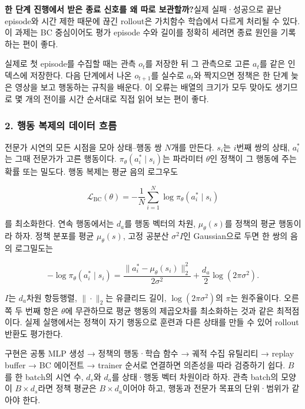 \documentclass[11pt,a4paper]{article}
\begin{document}
\par\medskip\noindent\textbf{한 단계 진행에서 받은 종료 신호를 왜 따로 보관할까?}\quad 실제 실패·성공으로 끝난 episode와 시간 제한 때문에 끊긴 rollout은 가치함수 학습에서 다르게 처리될 수 있다. 이 과제는 BC 중심이어도 평가 episode 수와 길이를 정확히 세려면 종료 원인을 기록하는 편이 좋다.\par

실제로 첫 episode를 수집할 때는 관측 $o_t$를 저장한 뒤 그 관측으로 고른 $a_t$를 같은 인덱스에 저장한다. 다음 단계에서 나온 $o_{t+1}$를 실수로 $a_t$와 짝지으면 정책은 한 단계 늦은 영상을 보고 행동하는 규칙을 배운다. 이 오류는 배열의 크기가 모두 맞아도 생기므로 몇 개의 전이를 시간 순서대로 직접 읽어 보는 편이 좋다.\par

\subsubsection{2. 행동 복제의 데이터 흐름}

전문가 시연의 모든 시점을 모아 상태–행동 쌍 $N$개를 만든다. $s_i$는 $i$번째 쌍의 상태, $a_i^*$는 그때 전문가가 고른 행동이다. $\pi_\theta(a_i^*\mid s_i)$는 파라미터 $\theta$인 정책이 그 행동에 주는 확률 또는 밀도다. 행동 복제는 평균 음의 로그우도\par

\[
\mathcal L_{\mathrm{BC}}(\theta)=-\frac1N\sum_{i=1}^N\log\pi_\theta(a_i^*\mid s_i)
\]

를 최소화한다. 연속 행동에서는 $d_a$를 행동 벡터의 차원, $\mu_\theta(s)$를 정책의 평균 행동이라 하자. 정책 분포를 평균 $\mu_\theta(s)$, 고정 공분산 $\sigma^2I$인 Gaussian으로 두면 한 쌍의 음의 로그밀도는\par

\[
-\log\pi_\theta(a_i^*\mid s_i)
=\frac{\|a_i^*-\mu_\theta(s_i)\|_2^2}{2\sigma^2}
+\frac{d_a}{2}\log(2\pi\sigma^2).
\]

$I$는 $d_a$차원 항등행렬, $\|\cdot\|_2$는 유클리드 길이, $\log(2\pi\sigma^2)$의 $\pi$는 원주율이다. 오른쪽 두 번째 항은 $\theta$에 무관하므로 평균 행동의 제곱오차를 최소화하는 것과 같은 최적점이다. 실제 실행에서는 정책이 자기 행동으로 훈련과 다른 상태를 만들 수 있어 rollout 반환도 평가한다.\par

구현은 공통 MLP 생성 → 정책의 행동·학습 함수 → 궤적 수집 유틸리티 → replay buffer → BC 에이전트 → trainer 순서로 연결하면 의존성을 따라 검증하기 쉽다. $B$를 한 batch의 시연 수, $d_s$와 $d_a$를 상태·행동 벡터 차원이라 하자. 관측 batch의 모양이 $B\times d_s$라면 정책 평균은 $B\times d_a$이어야 하고, 행동과 전문가 목표의 단위·범위가 같아야 한다.\par
\end{document}
